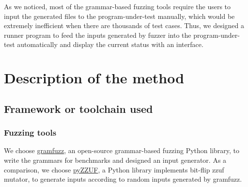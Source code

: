 \documentclass[11pt,a4paper]{article}
\begin{document}
As we noticed, most of the grammar-based fuzzing tools require the users to input the generated files to the program-under-test manually, which would be extremely inefficient when there are thousands of test cases. Thus, we designed a runner program to feed the inputs generated by fuzzer into the program-under-test automatically and display the current status with an interface.

\section{Description of the method}
\subsection{Framework or toolchain used}
\subsubsection{Fuzzing tools}
We choose \href{https://d0c-s4vage.github.io/gramfuzz/}{\cc gramfuzz}, an open-source grammar-based fuzzing Python library, to write the grammars for benchmarks and designed an input generator. As a comparison, we choose \href{https://pypi.org/project/pyZZUF/}{\cc pyZZUF}, a Python library implements bit-flip zzuf mutator, to generate inputs according to random inputs generated by {\cc gramfuzz}. 
%
\end{document}
